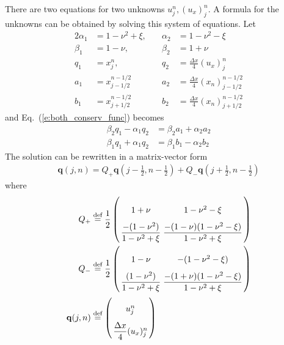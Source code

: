 \documentclass{turgon}
\begin{document}
There are two equations for two unknowns $u_j^n, (u_x)_j^n$.  A formula for the
unknowns can be obtained by solving this system of equations.  Let
\begin{alignat*}{2}
  \alpha_1 &= 1-\nu^2+\xi,\quad &\alpha_2 &= 1-\nu^2-\xi \\
  \beta_1 &= 1-\nu, &\beta_2 &= 1+\nu \\
  q_1 &= x_j^n, &q_2 &= \frac{\Delta x}{4}(u_x)_j^n \\
  a_1 &= x_{j-1/2}^{n-1/2}
 &a_2 &= \frac{\Delta x}{4}(x_n)_{j-1/2}^{n-1/2} \\
  b_1 &= x_{j+1/2}^{n-1/2}
 &b_2 &= \frac{\Delta x}{4}(x_n)_{j+1/2}^{n-1/2}
\end{alignat*}
and Eq.~(\ref{e:both_conserv_func}) becomes
\begin{align*}
  \beta_2q_1 - \alpha_1q_2 &= \beta_2a_1 + \alpha_2a_2 \\
  \beta_1q_1 + \alpha_1q_2 &= \beta_1b_1 - \alpha_2b_2
\end{align*}
The solution can be rewritten in a matrix-vector form
\begin{align*}
  \mathbf{q}(j,n) =
    Q_+\mathbf{q}(j-\frac{1}{2},n-\frac{1}{2})
  + Q_-\mathbf{q}(j+\frac{1}{2},n-\frac{1}{2})
\end{align*}
where
\begin{align*}
  Q_+ &\defeq
    \frac{1}{2}
    \left(
    \arraycolsep=1.4pt\def\arraystretch{2.2}
    \begin{array}{cc}
      1+\nu                                     &
      1-\nu^2-\xi                               \\
      \dfrac{-(1-\nu^2)}{1-\nu^2+\xi}            &
      \dfrac{-(1-\nu)(1-\nu^2-\xi)}{1-\nu^2+\xi}
    \end{array}\right) \\
  Q_- &\defeq
    \frac{1}{2}
    \left(
    \arraycolsep=1.4pt\def\arraystretch{2.2}
    \begin{array}{cc}
      1-\nu                                     &
      -(1-\nu^2-\xi)                            \\
      \dfrac{(1-\nu^2)}{1-\nu^2+\xi}             &
      \dfrac{-(1+\nu)(1-\nu^2-\xi)}{1-\nu^2+\xi}
    \end{array}\right) \\
  \mathbf{q}(j,n) &\defeq
    \left(
    \arraycolsep=1.4pt\def\arraystretch{2.2}
    \begin{array}{c}
      u_j^n \\ \dfrac{\Delta x}{4}(u_x)_j^n
    \end{array}\right)
\end{align*}
\end{document}
